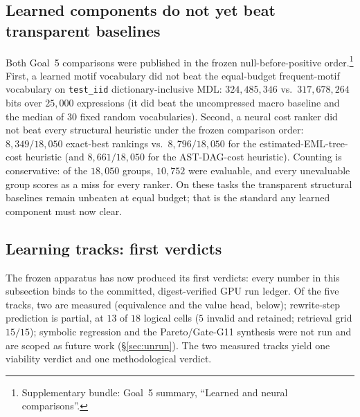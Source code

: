 \documentclass[11pt]{article}
\newcommand{\anchor}[1]{\footnote{#1}}
\begin{document}
\subsection{Learned components do not yet beat transparent baselines}
Both Goal~5 comparisons were published in the frozen null-before-positive
order.\anchor{Supplementary bundle: Goal~5 summary, ``Learned and neural
comparisons''.} First, a learned motif vocabulary did not beat the equal-budget frequent-motif
vocabulary on \texttt{test\_iid} dictionary-inclusive MDL:
$324{,}485{,}346$ vs.\ $317{,}678{,}264$ bits over $25{,}000$ expressions (it did
beat the uncompressed macro baseline and the median of $30$ fixed random
vocabularies). Second, a neural cost ranker did not beat every structural heuristic under the
frozen comparison order: $8{,}349/18{,}050$ exact-best rankings vs.\
$8{,}796/18{,}050$ for the estimated-EML-tree-cost heuristic (and
$8{,}661/18{,}050$ for the AST-DAG-cost heuristic). Counting is conservative:
of the $18{,}050$ groups, $10{,}752$ were evaluable, and every unevaluable
group scores as a miss for every ranker. On these tasks
the transparent structural baselines remain unbeaten at equal budget; that is
the standard any learned component must now clear.

\subsection{Learning tracks: first verdicts}
\label{sec:pending}
The frozen apparatus has now produced its first verdicts: every
number in this subsection binds to the committed, digest-verified GPU run
ledger. Of the five tracks, two are measured (equivalence and the value head,
below); rewrite-step prediction is partial, at $13$ of $18$ logical cells ($5$
invalid and retained; retrieval grid $15/15$); symbolic regression and the
Pareto/Gate-G11 synthesis were not run and are scoped as future work
(\S\ref{sec:unrun}). The two measured tracks yield one viability verdict and
one methodological verdict.
\end{document}
